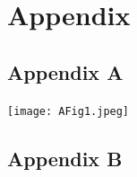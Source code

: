 \documentclass[10pt,a4paper]{article}
\renewcommand*{\refname}{References and Notes}
\newcommand{\beginsupplement}{%
        \setcounter{table}{0}
        \renewcommand{\thetable}{A\arabic{table}}%
        \setcounter{figure}{0}
        \renewcommand{\thefigure}{A\arabic{figure}}%
     }
\begin{document}
\vspace*{10mm}
\begin{multicols}{2}
\renewcommand*{\refname}{\normalsize{References and Notes}}

\begin{footnotesize}




\end{footnotesize}
\end{multicols}
\clearpage

\section{Appendix} 
\subsection{Appendix A} \label{Appendix A}

\beginsupplement

\vspace{\baselineskip}
\noindent \begin{minipage}{\columnwidth}
\centering
\resizebox{1.2\columnwidth}{!}
{\texttt{[image: AFig1.jpeg]}}
\end{minipage}

\clearpage
\subsection{Appendix B} \label{Appendix B}
\end{document}
